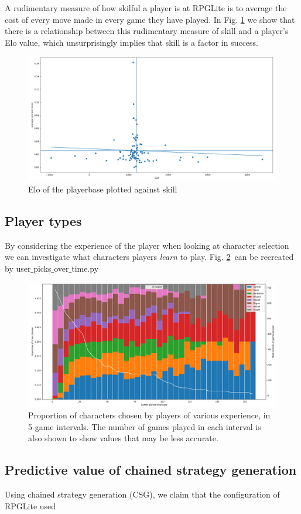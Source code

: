\documentclass{tufte-handout}
\begin{document}
A rudimentary measure of how skilful a player is at RPGLite is to average the cost of every move made in every game they have played. In Fig. \ref{fig:cost-over-Elo} we show that there is a relationship between this rudimentary measure of skill and a player's Elo value, which unsurprisingly implies that skill is a factor in success.

\begin{figure}
    \centering
    \includegraphics{cost_over_Elo.png}
    \caption{Elo of the playerbase plotted against skill}
    \label{fig:cost-over-Elo}
\end{figure}

\subsection{Player types}

By considering the experience of the player when looking at character selection we can investigate what characters players \textit{learn} to play. Fig. \ref{fig:char-select-by-exp}~can be recreated by user$\_$picks$\_$over$\_$time.py

\begin{figure}
    \centering
    \includegraphics{character_selection_by_games_played.png}
    \caption{Proportion of characters chosen by players of various experience, in 5 game intervals. The number of games played in each interval is also shown to show values that may be less accurate.}
    \label{fig:char-select-by-exp}
\end{figure}

\subsection{Predictive value of chained strategy generation}

Using chained strategy generation (CSG), we claim that the configuration of RPGLite used 
\end{document}
